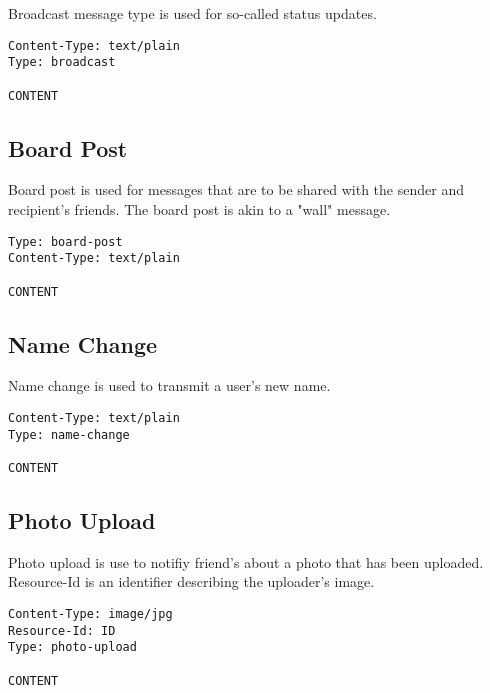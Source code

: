 \documentclass[letterpaper,11pt,oneside]{article}
\begin{document}
Broadcast message type is used for so-called status updates.

\vspace{10pt}
\begin{verbatim}
Content-Type: text/plain
Type: broadcast

CONTENT
\end{verbatim}
\vspace{10pt}

\subsection{Board Post}

Board post is used for messages that are to be shared with the sender and
recipient's friends. The board post is akin to a "wall" message.

\vspace{10pt}
\begin{verbatim}
Type: board-post
Content-Type: text/plain

CONTENT
\end{verbatim}
\vspace{10pt}

\subsection{Name Change}

Name change is used to transmit a user's new name.

\vspace{10pt}
\begin{verbatim}
Content-Type: text/plain
Type: name-change

CONTENT
\end{verbatim}
\vspace{10pt}

\subsection{Photo Upload}

Photo upload is use to notifiy friend's about a photo that has been uploaded.
Resource-Id is an identifier describing the uploader's image.

\vspace{10pt}
\begin{verbatim}
Content-Type: image/jpg
Resource-Id: ID
Type: photo-upload

CONTENT
\end{verbatim}
\vspace{10pt}
\end{document}
